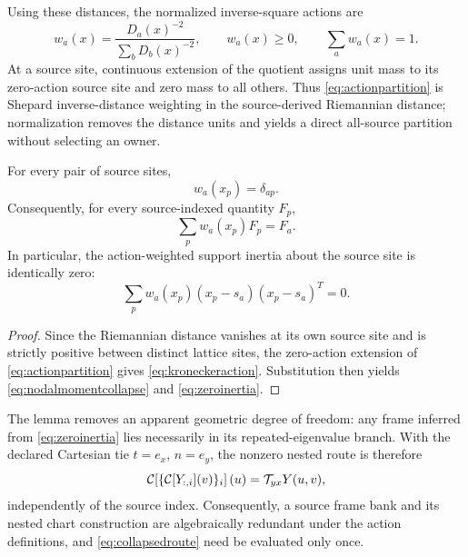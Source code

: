 Using these distances, the normalized inverse-square actions are
\begin{equation}
 w_a(x)=\frac{D_a(x)^{-2}}{\sum_bD_b(x)^{-2}},
 \qquad w_a(x)\geq0,\qquad\sum_aw_a(x)=1.
 \label{eq:actionpartition}
\end{equation}
At a source site, continuous extension of the quotient assigns unit mass to
its zero-action source site and zero mass to all others. Thus
\eqref{eq:actionpartition} is Shepard inverse-distance weighting
\cite{shepard1968} in the source-derived Riemannian distance; normalization
removes the distance units and yields a direct all-source partition without
selecting an owner.

\begin{lemma}
For every pair of source sites,
\begin{equation}
 w_a(x_p)=\delta_{ap}.
 \label{eq:kroneckeraction}
\end{equation}
Consequently, for every source-indexed quantity \(F_p\),
\begin{equation}
 \sum_pw_a(x_p)F_p=F_a.
 \label{eq:nodalmomentcollapse}
\end{equation}
In particular, the action-weighted support inertia about the source site is
identically zero:
\begin{equation}
 \sum_pw_a(x_p)(x_p-s_a)(x_p-s_a)^T=0.
 \label{eq:zeroinertia}
\end{equation}
\end{lemma}

\begin{proof}
Since the Riemannian distance vanishes at its own source site and is strictly
positive between distinct lattice sites, the zero-action extension of
\eqref{eq:actionpartition} gives \eqref{eq:kroneckeraction}. Substitution then
yields \eqref{eq:nodalmomentcollapse} and \eqref{eq:zeroinertia}.
\end{proof}

The lemma removes an apparent geometric degree of freedom: any frame inferred
from \eqref{eq:zeroinertia} lies necessarily in its repeated-eigenvalue
branch. With the declared Cartesian tie \(t=e_x\), \(n=e_y\), the nonzero
nested route is therefore
\begin{equation}
 \mathcal C\!\left[
   \{\mathcal C[Y_{:,i}](v)\}_{i}
 \right](u)=\mathcal{T}_{yx}Y(u,v),
 \label{eq:collapsedroute}
\end{equation}
independently of the source index. Consequently, a source frame bank and its
nested chart construction are algebraically redundant under the action
definitions, and \eqref{eq:collapsedroute} need be evaluated only once.

